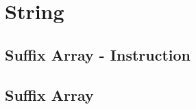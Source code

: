\documentclass[twocolumn]{article}
\begin{document}
\setlength\parindent{0pt}

\pagestyle{fancy}
\fancyfoot{}
\fancyhead[R]{\thepage}

\newpage

\section{String}

\subsection{Suffix Array - Instruction}


\subsection{Suffix Array}

\end{document}
